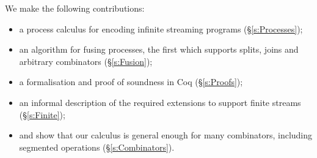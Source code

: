 We make the following contributions:
\begin{itemize}
\item a process calculus for encoding infinite streaming programs (\S\ref{s:Processes});
\item an algorithm for fusing processes, the first which supports splits, joins and arbitrary combinators (\S\ref{s:Fusion});
\item a formalisation and proof of soundness in Coq (\S\ref{s:Proofs});
\item an informal description of the required extensions to support finite streams (\S\ref{s:Finite});
\item and show that our calculus is general enough for many combinators, including segmented operations (\S\ref{s:Combinators}).
\end{itemize}


